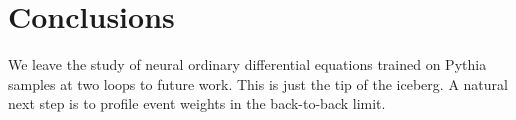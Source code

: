 \section{Conclusions}\label{sec:conclusions}

We leave the study of neural ordinary differential equations trained on
Pythia samples at two loops to future work. This is just the tip of the
iceberg. A natural next step is to profile event weights in the
back-to-back limit.

